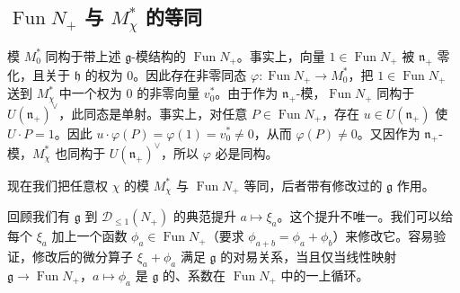 
\subsection{$\operatorname{Fun}N_+$ 与 $M_\chi^*$ 的等同}

模 $M_0^*$ 同构于带上述 $\mathfrak{g}$-模结构的 $\operatorname{Fun}N_+$。事实上，向量 $1\in\operatorname{Fun}N_+$ 被 $\mathfrak{n}_+$ 零化，且关于 $\mathfrak{h}$ 的权为 $0$。因此存在非零同态 $\varphi:\operatorname{Fun}N_+\to M_0^*$，把 $1\in\operatorname{Fun}N_+$ 送到 $M_\chi^*$ 中一个权为 $0$ 的非零向量 $v_0^*$。由于作为 $\mathfrak{n}_+$-模，$\operatorname{Fun}N_+$ 同构于 $U(\mathfrak{n}_+)^\vee$，此同态是单射。事实上，对任意 $P\in\operatorname{Fun}N_+$，存在 $u\in U(\mathfrak{n}_+)$ 使 $U\cdot P=1$。因此 $u\cdot\varphi(P)=\varphi(1)=v_0^*\ne0$，从而 $\varphi(P)\ne0$。又因作为 $\mathfrak{n}_+$-模，$M_\chi^*$ 也同构于 $U(\mathfrak{n}_+)^\vee$，所以 $\varphi$ 必是同构。


现在我们把任意权 $\chi$ 的模 $M_\chi^*$ 与 $\operatorname{Fun}N_+$ 等同，后者带有修改过的 $\mathfrak{g}$ 作用。

回顾我们有 $\mathfrak{g}$ 到 $\mathcal{D}_{\le1}(N_+)$ 的典范提升 $a\mapsto\xi_a$。这个提升不唯一。我们可以给每个 $\xi_a$ 加上一个函数 $\phi_a\in\operatorname{Fun}N_+$（要求 $\phi_{a+b}=\phi_a+\phi_b$）来修改它。容易验证，修改后的微分算子 $\xi_a+\phi_a$ 满足 $\mathfrak{g}$ 的对易关系，当且仅当线性映射 $\mathfrak{g}\to\operatorname{Fun}N_+$，$a\mapsto\phi_a$ 是 $\mathfrak{g}$ 的、系数在 $\operatorname{Fun}N_+$ 中的一上循环。

